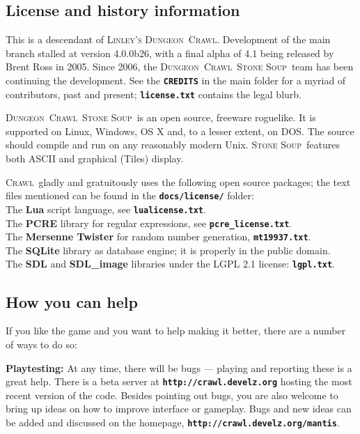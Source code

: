 \documentclass[a4paper,10pt]{article}
\newcommand{\key}[1]{{{\texttt{\textbf{#1}}}}} %
\newcommand{\slsl}{/\hspace{-0.2em}/} %
\newcommand{\crawl}{\textsc{Crawl}}
\newcommand{\dungeon}{\textsc{Dungeon}}
\newcommand{\soup}{\textsc{Stone Soup}}
\newcommand{\para}{\vspace{1.5ex}}
\begin{document}
\subsection*{License and history information}

This is a descendant of \textsc{Linley's} \dungeon\ \crawl. 
Development of the main branch stalled at version 4.0.0b26, with a final 
alpha of 4.1 being released by Brent Ross in 2005. Since 2006, the 
\dungeon\ \crawl\ \soup\ team has been continuing the 
development. See the \key{CREDITS} in the main folder for a myriad of 
contributors, past and present; \key{license.txt} contains the legal blurb.

\dungeon\ \crawl\ \soup\ is an open source, freeware roguelike. It is 
supported on Linux, Windows, OS X  and, to a lesser extent, on DOS. The 
source should compile and run on any reasonably modern Unix. \soup\ 
features both ASCII and graphical (Tiles) display.

\crawl\ gladly and gratuitously uses the following open source packages; the
text files mentioned can be found in the \key{docs/license/} folder: \\
The \textbf{Lua} script language, see \key{lualicense.txt}.\\
The \textbf{PCRE} library for regular expressions, see \key{pcre\_license.txt}.\\
The \textbf{Mersenne Twister} for random number generation, \key{mt19937.txt}.\\
The \textbf{SQLite} library as database engine; it is properly in the public domain.\\
The \textbf{SDL} and \textbf{SDL\_image} libraries under the LGPL 2.1 license: 
    \key{lgpl.txt}.


\subsection*{How you can help}

If you like the game and you want to help making it better, there are a number 
of ways to do so:

\para

\textbf{Playtesting:}
At any time, there will be bugs --- playing and reporting these is a great 
help. There is a beta server at \key{http:\slsl crawl.develz.org} hosting the
most recent version of the code. Besides pointing out bugs, you are also 
welcome to bring up ideas on how to improve interface or gameplay. Bugs and
new ideas can be added and discussed on the homepage, 
\key{http:\slsl crawl.develz.org/mantis}.
\end{document}
